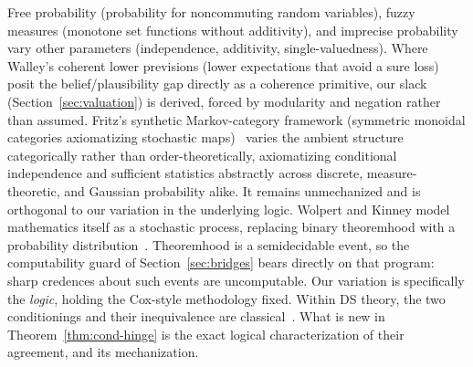 Free probability (probability for noncommuting random variables),
fuzzy measures (monotone set functions without additivity), and imprecise
probability~\cite{walley1991} vary other parameters (independence,
additivity, single-valuedness).  Where Walley's coherent lower
previsions (lower expectations that avoid a sure loss) posit the belief/plausibility gap directly as a
coherence primitive, our slack (Section~\ref{sec:valuation}) is
derived, forced by modularity and negation rather than assumed.
Fritz's synthetic Markov-category
framework (symmetric monoidal categories axiomatizing stochastic
maps)~\cite{fritz2020markov} varies the ambient structure
categorically rather than order-theoretically, axiomatizing
conditional independence and sufficient statistics abstractly
across discrete, measure-theoretic, and Gaussian probability alike.
It remains unmechanized and is orthogonal to our variation in the
underlying logic.  Wolpert and Kinney model
mathematics itself as a stochastic process, replacing binary
theoremhood with a probability distribution~\cite{wolpert-kinney2024}.
Theoremhood is a semidecidable event, so the computability guard of
Section~\ref{sec:bridges} bears directly on that program:
sharp credences about such events are uncomputable.  Our
variation is specifically the
\emph{logic}, holding the Cox-style methodology fixed.  Within DS
theory, the two conditionings and their inequivalence are
classical~\cite{shafer1976,fagin-halpern1991}.  What is new in
Theorem~\ref{thm:cond-hinge} is the exact logical characterization
of their agreement, and its mechanization.

